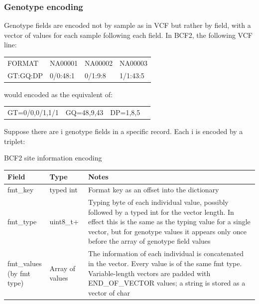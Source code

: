 \documentclass[8pt]{article}
\begin{document}
\subsubsection{Genotype encoding}
\label{GenotypeEncoding}

Genotype fields are encoded not by sample as in VCF but rather by field, with a vector of values for each sample following each field.
In BCF2, the following VCF line:

\vspace{0.3cm}
\begin{tabular}{l l l l}
FORMAT & NA00001 & NA00002 & NA00003 \\
GT:GQ:DP & 0/0:48:1 & 0/1:9:8 & 1/1:43:5 \\
\end{tabular}
\vspace{0.3cm}

would encoded as the equivalent of:

\vspace{0.3cm}
\begin{tabular}{l l l l}
GT=0/0,0/1,1/1 & GQ=48,9,43 & DP=1,8,5
\end{tabular}
\vspace{0.3cm}

Suppose there are i genotype fields in a specific record.
Each i is encoded by a triplet:

BCF2 site information encoding

\vspace{0.3cm}
\small
\begin{tabular}{ | p{2cm} | p{2.5cm} | p{9.5cm} | } \hline
Field & Type & Notes \\ \hline
fmt\_key & typed int & Format key as an offset into the dictionary \\ \hline
fmt\_type & uint8\_t+ & Typing byte of each individual value, possibly followed by a typed int for the vector length.
In effect this is the same as the typing value for a single vector, but for genotype values it appears only once before the array of genotype field values \\ \hline
\makecell[tl]{fmt\_values \\ (by fmt type)} & Array of values & The information of each individual is concatenated in the vector.  Every value is of the same fmt type.
Variable-length vectors are padded with END\_OF\_VECTOR values; a string is stored as a vector of char \\  \hline
\end{tabular}
\normalsize
\vspace{0.3cm}
\end{document}

